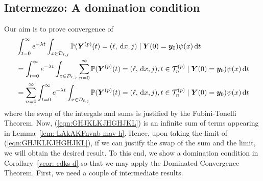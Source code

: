 \subsection{Intermezzo: A domination condition}
Our aim is to prove convergence of 
\begin{align} 
	&\int_{t=0}^\infty e^{-\lambda t}\int_{x\in\mathcal{D}_{\ell,j}}\mathbb P({\boldsymbol Y}^{(p)}(t) = (\ell,\, \mathrm{d} x, j) \mid  \nonumber 
	\boldsymbol Y(0) = \boldsymbol y_0)\psi(x)\, \mathrm{d} t \nonumber
	\\&=\int_{t=0}^\infty e^{-\lambda t}\int_{x\in\mathcal{D}_{\ell,j}}\sum_{n=0}^\infty\mathbb P({\boldsymbol Y}^{(p)}(t) = (\ell,\, \mathrm{d} x, j), t\in\mathcal T_n^{(p)} \mid  \nonumber 
	\boldsymbol Y(0) = \boldsymbol y_0)\psi(x)\, \mathrm{d} t \nonumber
	\\&=\sum_{n=0}^\infty\int_{t=0}^\infty e^{-\lambda t}\int_{x\in\mathcal{D}_{\ell,j}}\mathbb P({\boldsymbol Y}^{(p)}(t) = (\ell,\, \mathrm{d} x, j), t\in\mathcal T_n^{(p)} \mid   
	\boldsymbol Y(0) = \boldsymbol y_0)\psi(x)\, \mathrm{d} t \label{eqn:GHJKLKJHGHJKL}
\end{align}
where the swap of the intergals and sums is justified by the Fubini-Tonelli Theorem. Now, (\ref{eqn:GHJKLKJHGHJKL}) is an infinite sum of terms appearing in Lemma~\ref{lem: LAkAKFnvnb mav h}. Hence, upon taking the limit of (\ref{eqn:GHJKLKJHGHJKL}), if we can justify the swap of the sum and the limit, we will obtain the desired result. To this end, we show a domination condition in Corollary~\ref{vcor: cdks d} so that we may apply the Dominated Convergence Theorem. First, we need a couple of intermediate results. %



